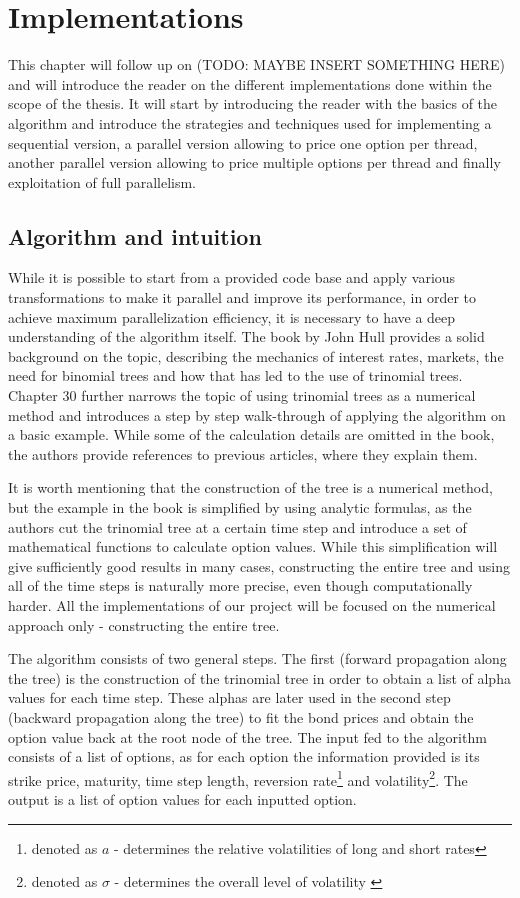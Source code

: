 \chapter{Implementations}
\label{Implementations}
This chapter will follow up on (TODO: MAYBE INSERT SOMETHING HERE) and will introduce the reader on the different implementations done within the scope of the thesis. It will start by introducing the reader with the basics of the algorithm and introduce the strategies and techniques used for implementing a sequential version, a parallel version allowing to price one option per thread, another parallel version allowing to price multiple options per thread and finally exploitation of full parallelism. 

\section{Algorithm and intuition}
\label{section:algorithm_and_intuition}
While it is possible to start from a provided code base and apply various transformations to make it parallel and improve its performance, in order to achieve maximum parallelization efficiency, it is necessary to have a deep understanding of the algorithm itself. The book by John Hull\cite{ofod} provides a solid background on the topic, describing the mechanics of interest rates, markets, the need for binomial trees and how that has led to the use of trinomial trees. Chapter 30 further narrows the topic of using trinomial trees as a numerical method and introduces a step by step walk-through of applying the algorithm on a basic example. While some of the calculation details are omitted in the book, the authors provide references to previous articles\cite{npfits}\cite{uhwirt}, where they explain them. 

It is worth mentioning that the construction of the tree is a numerical method, but the example in the book is simplified by using analytic formulas, as the authors cut the trinomial tree at a certain time step and introduce a set of mathematical functions to calculate option values. While this simplification will give sufficiently good results in many cases, constructing the entire tree and using all of the time steps is naturally more precise, even though computationally harder. All the implementations of our project will be focused on the numerical approach only - constructing the entire tree.

The algorithm consists of two general steps. The first (forward propagation along the tree) is the construction of the trinomial tree in order to obtain a list of alpha values for each time step. These alphas are later used in the second step (backward propagation along the tree) to fit the bond prices and obtain the option value back at the root node of the tree. The input fed to the algorithm consists of a list of options, as for each option the information provided is its strike price, maturity, time step length, reversion rate\footnote{denoted as $a$ - determines the relative volatilities of long and short rates\cite[pg.9]{npfits}} and volatility\footnote{denoted as $\sigma$ - determines the overall level of volatility \cite[pg. 9]{npfits}}. The output is a list of option values for each inputted option. 

